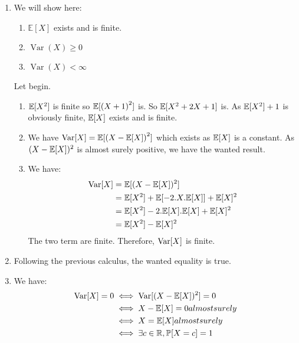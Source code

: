 \begin{solution}
  \begin{enumerate}
    \item We will show here:
          \begin{enumerate}
            \item $\mathbb{E}[X]$ exists and is finite.
            \item $\operatorname{Var}(X) \geq 0$
            \item $\operatorname{Var}(X) < \infty$
          \end{enumerate}
          Let begin.
          \begin{enumerate}
            \item $\mathbb{E}[X^2]$ is finite so $\mathbb{E}[{(X+1)}^2]$ is. So $\mathbb{E}[X^2 + 2X + 1]$ is.
                  As $\mathbb{E}[X^2] +1$ is obviously finite, $\mathbb{E}[X]$ exists and is finite.
            \item We have $\operatorname{Var}[X] = \mathbb{E}[{(X-\mathbb{E}[X])}^2]$ which exists as $\mathbb{E}[X]$ is a constant. As $(X-\mathbb{E}[X])^2$ is almost surely positive, we have the wanted result.
            \item We have:
                  \begin{align*}
                    \operatorname{Var}[X] & = \mathbb{E}[(X-\mathbb{E}[X])^2]                                     \\
                            & = \mathbb{E}[X^2] + \mathbb{E}[- 2.X.\mathbb{E}[X]] + \mathbb{E}[X]^2 \\
                            & = \mathbb{E}[X^2] - 2.\mathbb{E}[X].\mathbb{E}[X] + \mathbb{E}[X]^2   \\
                            & = \mathbb{E}[X^2] - \mathbb{E}[X]^2
                  \end{align*}
                  The two term are finite. Therefore, $\operatorname{Var}[X]$ is finite.
          \end{enumerate}
    \item Following the previous calculus, the wanted equality is true.
    \item We have:
          \begin{align*}
            \operatorname{Var}[X] = 0 & \iff \operatorname{Var}[(X-\mathbb{E}[X])^2] = 0               \\
                        & \iff X - \mathbb{E}[X] = 0 almost surely         \\
                        & \iff X = \mathbb{E}[X] almost surely             \\
                        & \iff \exists c \in \mathbb{R}, \mathbb{P}[X = c] = 1
          \end{align*}


\end{enumerate}
\end{solution}
